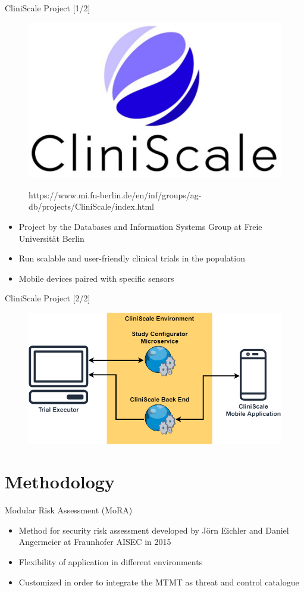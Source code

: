 \documentclass[xcolor=table]{beamer}
\begin{document}
\begin{frame}{CliniScale Project [1/2]}
 \begin{figure}[H]
  \includegraphics[width=0.3\linewidth]{img/cliniscale_logo_930.png}
  \label{fig:cliniscalelogo}
  \captionsetup{labelformat=empty}
  \caption{https://www.mi.fu-berlin.de/en/inf/groups/ag-db/projects/CliniScale/index.html}
\end{figure}
\begin{itemize}
    \item Project by the Databases and Information Systems Group at Freie Universität Berlin
    \item Run scalable and user-friendly clinical trials in the population
    \item Mobile devices paired with specific sensors
\end{itemize}
\end{frame}

\begin{frame}{CliniScale Project [2/2]}
 \begin{figure}[H]
  \includegraphics[width=\linewidth]{img/cs-flowchart.png}
  \label{fig:cliniscaleflow}
\end{figure}
\end{frame}

\section{Methodology}
\begin{frame}{Modular Risk Assessment (MoRA)}
\begin{itemize}
    \item Method for security risk assessment developed by Jörn Eichler and Daniel Angermeier at Fraunhofer AISEC in 2015
    \item Flexibility of application in different environments
    \item Customized in order to integrate the MTMT as threat and control catalogue
\end{itemize}
\end{frame}
\end{document}
